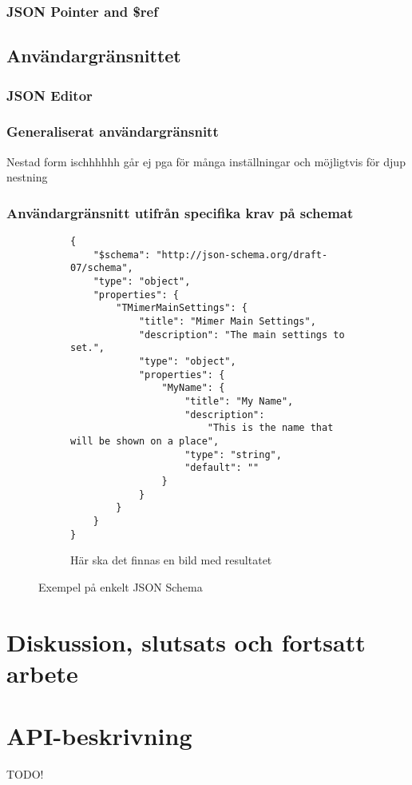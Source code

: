 \documentclass[swedish]{kththesis}
\begin{document}
\subsection{JSON Pointer and \$ref}

\section{Användargränsnittet}

\subsection{JSON Editor}

\subsection{Generaliserat användargränsnitt}
 Nestad form ischhhhhh
	 går ej pga för många inställningar och möjligtvis för djup nestning

\subsection{Användargränsnitt utifrån specifika krav på schemat}
\begin{figure}
	\begin{subfigure}{\textwidth}
		\centering
		\begin{verbatim}
{
	"$schema": "http://json-schema.org/draft-07/schema",
	"type": "object",
	"properties": {
		"TMimerMainSettings": {
			"title": "Mimer Main Settings",
			"description": "The main settings to set.",
			"type": "object",
			"properties": {
				"MyName": {
					"title": "My Name",
					"description":
						"This is the name that will be shown on a place",
					"type": "string",
					"default": ""
				}
			}
		}
	}
}
		\end{verbatim}
		\vspace{2em}
	\end{subfigure}
	\begin{subfigure}{\textwidth}
		\centering
		Här ska det finnas en bild med resultatet
	\end{subfigure}
	\caption{Exempel på enkelt JSON Schema}
\end{figure}

\chapter{Diskussion, slutsats och fortsatt arbete}


\printbibliography[heading=bibintoc] %

\appendix

\chapter{API-beskrivning}
\label{appendix:api-beskrivning}
TODO!
\end{document}
